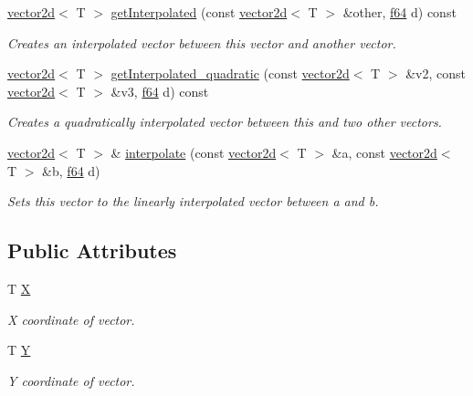 \begin{DoxyCompactItemize}
\hyperlink{classirr_1_1core_1_1vector2d}{vector2d}$<$ T $>$ \hyperlink{classirr_1_1core_1_1vector2d_ac800722ea56bf8878dc7b67d490464c3}{get\+Interpolated} (const \hyperlink{classirr_1_1core_1_1vector2d}{vector2d}$<$ T $>$ \&other, \hyperlink{namespaceirr_a1325b02603ad449f92c68fc640af9b28}{f64} d) const
\begin{DoxyCompactList}\small\item\em Creates an interpolated vector between this vector and another vector. \end{DoxyCompactList}\item 
\hyperlink{classirr_1_1core_1_1vector2d}{vector2d}$<$ T $>$ \hyperlink{classirr_1_1core_1_1vector2d_aa4bfe9ae4f1e354eeac2ee8d9c2ca7fd}{get\+Interpolated\+\_\+quadratic} (const \hyperlink{classirr_1_1core_1_1vector2d}{vector2d}$<$ T $>$ \&v2, const \hyperlink{classirr_1_1core_1_1vector2d}{vector2d}$<$ T $>$ \&v3, \hyperlink{namespaceirr_a1325b02603ad449f92c68fc640af9b28}{f64} d) const
\begin{DoxyCompactList}\small\item\em Creates a quadratically interpolated vector between this and two other vectors. \end{DoxyCompactList}\item 
\hyperlink{classirr_1_1core_1_1vector2d}{vector2d}$<$ T $>$ \& \hyperlink{classirr_1_1core_1_1vector2d_a85bc48f5c313764fd56b51c730a62210}{interpolate} (const \hyperlink{classirr_1_1core_1_1vector2d}{vector2d}$<$ T $>$ \&a, const \hyperlink{classirr_1_1core_1_1vector2d}{vector2d}$<$ T $>$ \&b, \hyperlink{namespaceirr_a1325b02603ad449f92c68fc640af9b28}{f64} d)
\begin{DoxyCompactList}\small\item\em Sets this vector to the linearly interpolated vector between a and b. \end{DoxyCompactList}\end{DoxyCompactItemize}
\subsection*{Public Attributes}
\begin{DoxyCompactItemize}
\item 
\mbox{\label{classirr_1_1core_1_1vector2d_a8fabb0d10a3dd33b407b63bb3539be4d}} 
T \hyperlink{classirr_1_1core_1_1vector2d_a8fabb0d10a3dd33b407b63bb3539be4d}{X}
\begin{DoxyCompactList}\small\item\em X coordinate of vector. \end{DoxyCompactList}\item 
\mbox{\label{classirr_1_1core_1_1vector2d_aa4d36f518d3fc35a7aafcea33a31f76c}} 
T \hyperlink{classirr_1_1core_1_1vector2d_aa4d36f518d3fc35a7aafcea33a31f76c}{Y}
\begin{DoxyCompactList}\small\item\em Y coordinate of vector. \end{DoxyCompactList}\end{DoxyCompactItemize}


